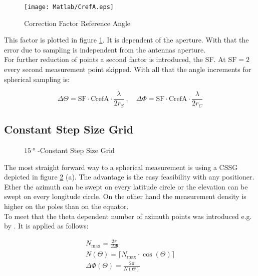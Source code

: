 \begin{figure}
\centering
\texttt{[image: Matlab/CrefA.eps]}
\caption{Correction Factor Reference Angle}
\label{fig:crefa}
\end{figure}

This factor is plotted in figure \ref{fig:crefa}. It is dependent of the aperture. With that the error due to sampling is independent from the antennas aperture.\\
For further reduction of points a second factor is introduced, the \acf{SF}. At $\text{SF}=2$ every second measurement point skipped. With all that the angle increments for spherical sampling is:

\begin{equation}
\Delta\Theta = \text{SF}\cdot\text{CrefA}\cdot\frac{\lambda}{2r_S}\ ,\quad\Delta\Phi = \text{SF}\cdot\text{CrefA}\cdot\frac{\lambda}{2r_C}
\end{equation}

\subsection{Constant Step Size Grid}


\begin{figure}[h]
  \centering
  \centering
\caption{$\SI{15}{\degree}$ -Constant Step Size Grid}
\label{fig:cssg}
\end{figure}

The most straight forward way to a spherical measurement is using a \ac{CSSG} depicted in figure \ref{fig:cssg} (a). The advantage is the easy feasibility with any positioner. Ether the azimuth can be swept on every latitude circle or the elevation can be swept on every longitude circle. On the other hand the measurement density is higher on the poles than on the equator.\\
To meet that the theta dependent number of azimuth points was introduced e.g. by \cite{ctiaat}. It is applied as follows:

\begin{align}
N_{\text{max}} = \frac{2\pi}{\Delta\Phi}\\
N\left(\Theta\right)=\lceil N_{\text{max}}\cdot\cos\left(\Theta\right)\rceil\\
\Delta\Phi\left(\Theta\right) = \frac{2\pi}{N\left(\Theta\right)}
\end{align}

